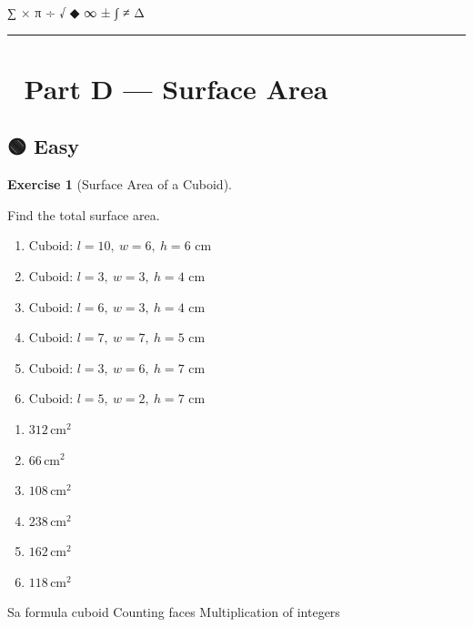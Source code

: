 \documentclass[
  letterpaper,
  DIV=11,
  numbers=noendperiod]{scrreprt}
\theoremstyle{definition}
\newtheorem{exercise}{Exercise}[chapter]
\theoremstyle{remark}
\begin{document}
∑ × π ÷ √ ◆ ∞ ± ∫ ≠ Δ

\begin{center}\rule{0.5\linewidth}{0.5pt}\end{center}

\section{🎨 Part D --- Surface Area}\label{sec-sa}

\subsection{🟢 Easy}

\begin{exercise}[Surface Area of a
Cuboid]\protect\hypertarget{exr-sa-1}{}\label{exr-sa-1}

Find the total surface area.

\begin{enumerate}
\def\labelenumi{\alph{enumi})}
\item
  \(\text{Cuboid: }l=10,\ w=6,\ h=6\text{ cm}\)
\item
  \(\text{Cuboid: }l=3,\ w=3,\ h=4\text{ cm}\)
\item
  \(\text{Cuboid: }l=6,\ w=3,\ h=4\text{ cm}\)
\item
  \(\text{Cuboid: }l=7,\ w=7,\ h=5\text{ cm}\)
\item
  \(\text{Cuboid: }l=3,\ w=6,\ h=7\text{ cm}\)
\item
  \(\text{Cuboid: }l=5,\ w=2,\ h=7\text{ cm}\)
\end{enumerate}

\begin{tcolorbox}[enhanced jigsaw, opacitybacktitle=0.6, coltitle=black, arc=.35mm, colframe=quarto-callout-tip-color-frame, colback=white, bottomrule=.15mm, left=2mm, colbacktitle=quarto-callout-tip-color!10!white, titlerule=0mm, opacityback=0, title=\textcolor{quarto-callout-tip-color}{\faLightbulb}\hspace{0.5em}{🔍 View Solution}, leftrule=.75mm, breakable, rightrule=.15mm, bottomtitle=1mm, toptitle=1mm, toprule=.15mm]

\begin{enumerate}
\def\labelenumi{\alph{enumi})}
\item
  \(312\,\text{cm}^{2}\)
\item
  \(66\,\text{cm}^{2}\)
\item
  \(108\,\text{cm}^{2}\)
\item
  \(238\,\text{cm}^{2}\)
\item
  \(162\,\text{cm}^{2}\)
\item
  \(118\,\text{cm}^{2}\)
\end{enumerate}

\end{tcolorbox}

{Sa formula cuboid} {Counting faces} {Multiplication of integers}

\end{exercise}
\end{document}

